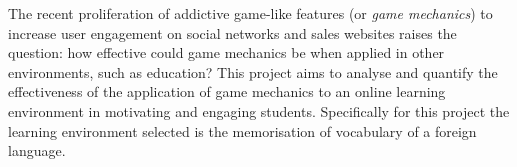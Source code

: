 The recent proliferation of addictive game-like features (or \textit{game mechanics}) to increase user engagement on social networks and sales websites raises the question: how effective could game mechanics be when applied in other environments, such as education? This project aims to analyse and quantify the effectiveness of the application of game mechanics to an online learning environment in motivating and engaging students. Specifically for this project the learning environment selected is the memorisation of vocabulary of a foreign language.
